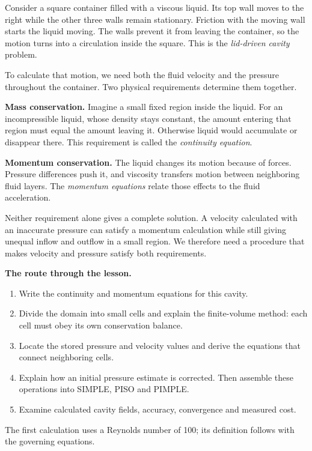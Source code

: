 Consider a square container filled with a viscous liquid. Its top wall moves
to the right while the other three walls remain stationary. Friction with
the moving wall starts the liquid moving. The walls prevent it from leaving
the container, so the motion turns into a circulation inside the square.
This is the \emph{lid-driven cavity} problem.

To calculate that motion, we need both the fluid velocity and the pressure
throughout the container. Two physical requirements determine them together.

\textbf{Mass conservation.} Imagine a small fixed region inside the liquid.
For an incompressible liquid, whose density stays constant, the amount entering that region must equal the
amount leaving it. Otherwise liquid would accumulate or disappear there.
This requirement is called the \emph{continuity equation}.

\textbf{Momentum conservation.} The liquid changes its motion because of
forces. Pressure differences push it, and viscosity transfers motion between
neighboring fluid layers. The \emph{momentum equations} relate those effects
to the fluid acceleration.

Neither requirement alone gives a complete solution. A velocity calculated
with an inaccurate pressure can satisfy a momentum calculation while still
giving unequal inflow and outflow in a small region. We therefore need a
procedure that makes velocity and pressure satisfy both requirements.

\textbf{The route through the lesson.}
\begin{enumerate}
\item Write the continuity and momentum equations for this cavity.
\item Divide the domain into small cells and explain the finite-volume method:
      each cell must obey its own conservation balance.
\item Locate the stored pressure and velocity values and derive the equations
      that connect neighboring cells.
\item Explain how an initial pressure estimate is corrected. Then assemble
      these operations into SIMPLE, PISO and PIMPLE.
\item Examine calculated cavity fields, accuracy, convergence and measured cost.
\end{enumerate}
The first calculation uses a Reynolds number
of 100; its definition follows with the governing equations.
